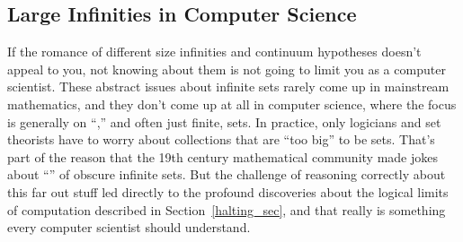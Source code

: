 \subsection{Large Infinities in Computer Science}

If the romance of different size infinities and continuum hypotheses
doesn't appeal to you, not knowing about them is not going to limit
you as a computer scientist.  These abstract issues about infinite
sets rarely come up in mainstream mathematics, and they don't come up
at all in computer science, where the focus is generally on
``,'' and often just finite, sets.  In practice, only
logicians and set theorists have to worry about collections that are
``too big'' to be sets.  That's part of the reason that the 19th
century mathematical community made jokes about ``'' of obscure infinite sets.  But the challenge of
reasoning correctly about this far out stuff led directly to the
profound discoveries about the logical limits of computation described
in Section~\ref{halting_sec}, and that really is something every
computer scientist should understand.


\endinput
